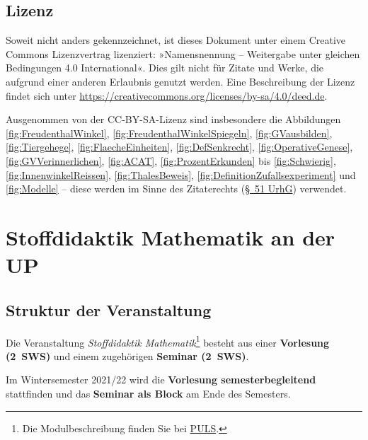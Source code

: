 \documentclass[
  ngerman,
]{scrbook}
\theoremstyle{definition}
\theoremstyle{definition}
\theoremstyle{definition}
\theoremstyle{definition}
\theoremstyle{remark}
\begin{document}
\hypertarget{lizenz}{%
\section*{Lizenz}\label{lizenz}}

Soweit nicht anders gekennzeichnet, ist dieses Dokument unter einem Creative Commons Lizenzvertrag lizenziert: »Namensnennung -- Weitergabe unter gleichen Bedingungen 4.0 International«. Dies gilt nicht für Zitate und Werke, die aufgrund einer anderen Erlaubnis genutzt werden.
Eine Beschreibung der Lizenz findet sich unter \url{https://creativecommons.org/licenses/by-sa/4.0/deed.de}.

Ausgenommen von der CC-BY-SA-Lizenz sind insbesondere die Abbildungen \ref{fig:FreudenthalWinkel}, \ref{fig:FreudenthalWinkelSpiegeln}, \ref{fig:GVausbilden}, \ref{fig:Tiergehege}, \ref{fig:FlaecheEinheiten}, \ref{fig:DefSenkrecht}, \ref{fig:OperativeGenese}, \ref{fig:GVVerinnerlichen}, \ref{fig:ACAT}, \ref{fig:ProzentErkunden} bis \ref{fig:Schwierig}, \ref{fig:InnenwinkelReissen}, \ref{fig:ThalesBeweis}, \ref{fig:DefinitionZufallsexperiment} und \ref{fig:Modelle} -- diese werden im Sinne des Zitaterechts (\href{https://www.gesetze-im-internet.de/urhg/__51.html}{§~51 UrhG}) verwendet.

\hypertarget{stoffdidaktik-mathematik-an-der-up}{%
\chapter{Stoffdidaktik Mathematik an der UP}\label{stoffdidaktik-mathematik-an-der-up}}

\hypertarget{struktur-der-veranstaltung}{%
\section{Struktur der Veranstaltung}\label{struktur-der-veranstaltung}}

Die Veranstaltung \emph{Stoffdidaktik Mathematik}\footnote{Die Modulbeschreibung finden Sie bei \href{https://puls.uni-potsdam.de/qisserver/rds?state=verpublish\&status=init\&vmfile=no\&moduleCall=modulansicht\&publishConfFile=modulverwaltung\&publishSubDir=up/modulbearbeiter\&\&modul.modul_id=3155\&menuid=\&topitem=Modulbeschreibung\&subitem=}{PULS}.} besteht aus einer \textbf{Vorlesung (2~SWS)} und einem zugehörigen \textbf{Seminar (2~SWS)}.

Im Wintersemester 2021/22 wird die \textbf{Vorlesung semesterbegleitend} stattfinden und das \textbf{Seminar als Block} am Ende des Semesters.
\end{document}
